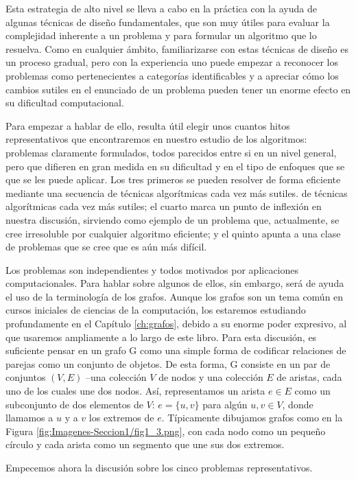 \documentclass[a4paper, 12pt]{book}
\begin{document}
Esta estrategia de alto nivel se lleva a cabo en la práctica con la ayuda de algunas técnicas de diseño fundamentales, que son muy útiles para evaluar la complejidad inherente a un problema y para formular un algoritmo que lo resuelva. Como en cualquier ámbito, familiarizarse con estas técnicas de diseño es un proceso gradual, pero con la experiencia uno puede empezar a reconocer los problemas como pertenecientes a categorías identificables y a apreciar cómo los cambios sutiles en el enunciado de un problema pueden tener un enorme efecto en su dificultad computacional.

Para empezar a hablar de ello, resulta útil elegir unos cuantos hitos representativos que encontraremos en nuestro estudio de los algoritmos: problemas claramente formulados, todos parecidos entre si en un nivel general, pero que difieren en gran medida en su dificultad y en el tipo de enfoques que se que se les puede aplicar. Los tres primeros se pueden resolver de forma eficiente mediante una secuencia de técnicas algorítmicas cada vez más sutiles. de técnicas algorítmicas cada vez más sutiles; el cuarto marca un punto de inflexión en nuestra discusión, sirviendo como ejemplo de un problema que, actualmente, se cree irresoluble por cualquier algoritmo eficiente; y el quinto apunta a una clase de problemas que se cree que es aún más difícil.

Los problemas son independientes y todos motivados por aplicaciones computacionales. Para hablar sobre algunos de ellos, sin embargo, será de ayuda el uso de la terminología de los grafos. Aunque los grafos son un tema común en cursos iniciales de ciencias de la computación, los estaremos estudiando profundamente en el Capítulo \ref{ch:grafos}, debido a su enorme poder expresivo, al que usaremos ampliamente a lo largo de este libro. Para esta discusión, es suficiente pensar en un grafo G como una simple forma de codificar relaciones de parejas como un conjunto de objetos. De esta forma, G consiste en un par de conjuntos $(V,E)$ --una colección $V$ de nodos y una colección $E$ de aristas, cada uno de los cuales une dos nodos. Así, representamos un arista $e \in  E$ como un subconjunto de dos elementos de $V$: $e = \{u,v\}$ para algún $u,v \in V$, donde llamamos a $u$ y a $v$ los extremos de $e$. Típicamente dibujamos grafos como en la Figura \ref{fig:Imagenes-Seccion1/fig1_3.png}, con cada nodo como un pequeño círculo y cada arista como un segmento que une sus dos extremos.

Empecemos ahora la discusión sobre los cinco problemas representativos.
\end{document}
